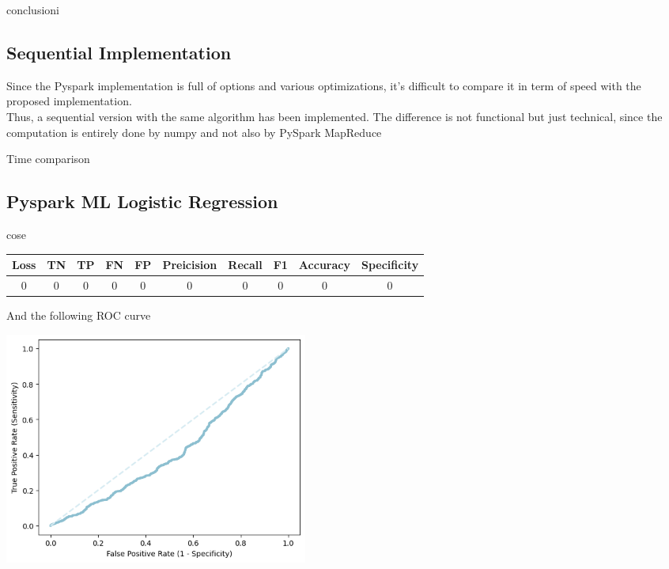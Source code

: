 \documentclass[
	letterpaper, %
	10pt, %
]{class}
\begin{document}
conclusioni

\subsection{Sequential Implementation}

Since the Pyspark implementation is full of options and various optimizations, it's difficult to compare it in term of speed with the proposed implementation.\\
Thus, a sequential version with the same algorithm has been implemented. The difference is not functional but just technical, since the computation is entirely done by numpy and not also by PySpark MapReduce


Time comparison

\subsection{Pyspark ML Logistic Regression}

cose

\begin{center}
    \begin{tabular}{ |c|c|c|c|c|c|c|c|c|c| }
        \hline
        Loss & TN & TP & FN & FP & Preicision & Recall & F1 & Accuracy & Specificity \\
        \hline
        0    & 0  & 0  & 0  & 0  & 0          & 0      & 0  & 0        & 0           \\
        \hline
    \end{tabular}
\end{center}

And the following ROC curve

\begin{center}
    \includegraphics[width=10cm]{../images/ml_logistic.png}
\end{center}
\end{document}
